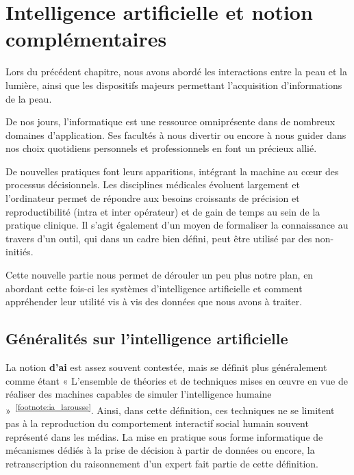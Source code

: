 \chapter{Intelligence artificielle et notion complémentaires}
\label{chap:chapter_3}
\chapterintro
Lors du précédent chapitre, nous avons abordé les interactions entre la peau et la lumière, ainsi que les dispositifs majeurs permettant l'acquisition d'informations de la peau.\par

De nos jours, l’informatique est une ressource omniprésente dans de nombreux domaines d’application. Ses facultés à nous divertir ou encore à nous guider dans nos choix quotidiens personnels et professionnels en font un précieux allié.\par 

De nouvelles pratiques font leurs apparitions, intégrant la machine au cœur des processus décisionnels. Les disciplines médicales évoluent largement et l’ordinateur permet de répondre aux besoins croissants de précision et reproductibilité (intra et inter opérateur) et de gain de temps au sein de la pratique clinique. Il s’agit également d’un moyen de formaliser la connaissance au travers d’un outil, qui dans un cadre bien défini, peut être utilisé par des non-initiés.\par

Cette nouvelle partie nous permet de dérouler un peu plus notre plan, en abordant cette fois-ci les systèmes d'intelligence artificielle et comment appréhender leur utilité vis à vis des données que nous avons à traiter.\par
\newpage

\section{Généralités sur l'intelligence artificielle}
\label{sec:artificial_intelligence}
La notion \textbf{d’\gls{ai}} est assez souvent contestée, mais se définit plus généralement comme étant « L’ensemble de théories et de techniques mises en œuvre en vue de réaliser des machines capables de simuler l'intelligence humaine »~\textsuperscript{\ref{footnote:ia_larousse}}. Ainsi, dans cette définition, ces techniques ne se limitent pas à la reproduction du comportement interactif social humain souvent représenté dans les médias. La mise en pratique sous forme informatique de mécanismes dédiés à la prise de décision à partir de données ou encore, la retranscription du raisonnement d'un expert fait partie de cette définition.\par


